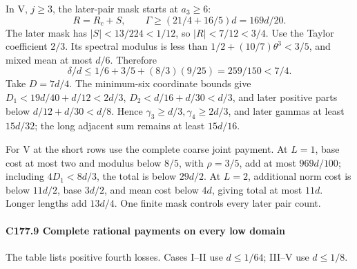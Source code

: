 In V, \(j\ge3\), the later-pair mask starts at \(a_3\ge6\):
\[
R=R_c+S,\qquad\Gamma\ge(21/4+16/5)d=169d/20.
\]
The later mask has \(|S|<13/224<1/12\), so \(|R|<7/12<3/4\). Use the Taylor coefficient \(2/3\). Its spectral modulus is less than \(1/2+(10/7)\theta^3<3/5\), and mixed mean at most \(d/6\). Therefore
\[
\delta/d\le1/6+3/5+(8/3)(9/25)=259/150<7/4.
\]
Take \(D=7d/4\). The minimum-six coordinate bounds give \(D_1<19d/40+d/12<2d/3\), \(D_2<d/16+d/30<d/3\), and later positive parts below \(d/12+d/30<d/8\). Hence \(\gamma_3\ge d/3,\allowbreak \allowbreak  \gamma_4\ge2d/3\), and later gammas at least \(15d/32\); the long adjacent sum remains at least \(15d/16\).

For V at the short rows use the complete coarse joint payment. At \(L=1\), base cost at most two and modulus below \(8/5\), with \(\rho=3/5\), add at most \(969d/100\); including \(4D_1<8d/3\), the total is below \(29d/2\). At \(L=2\), additional norm cost is below \(11d/2\), base \(3d/2\), and mean cost below \(4d\), giving total at most \(11d\). Longer lengths add \(13d/4\). One finite mask controls every later pair count.

\paragraph{C177.9 Complete rational payments on every low domain}

The table lists positive fourth losses. Cases I--II use \(d\le1/64\); III--V use \(d\le1/8\).


